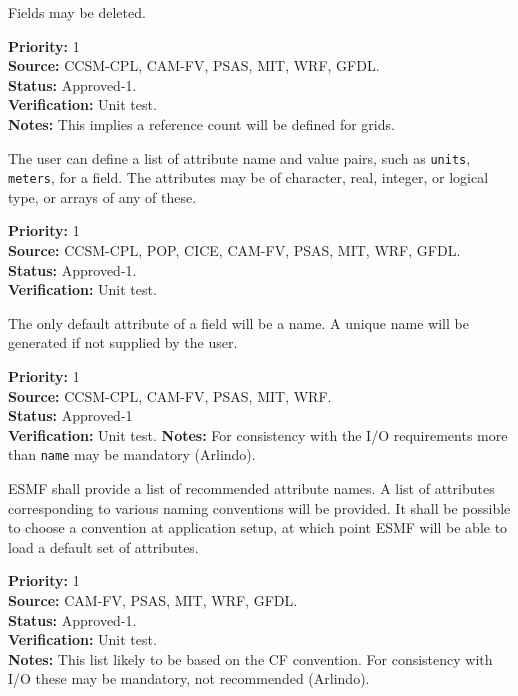 Fields may be deleted.
\begin{reqlist} 
{\bf Priority:} 1 \\
{\bf Source:} CCSM-CPL, CAM-FV, PSAS, MIT, WRF, GFDL. \\
{\bf Status:} Approved-1. \\
{\bf Verification:} Unit test. \\
{\bf Notes:} This implies a reference count will be defined for grids.
\end{reqlist}

The user can define a list of attribute name and value pairs, such 
as {\tt units}, {\tt meters}, for a field.  
The attributes may be of character, real, integer, or logical type,
or arrays of any of these.
\begin{reqlist}
{\bf Priority:} 1 \\
{\bf Source:} CCSM-CPL, POP, CICE, CAM-FV, PSAS, MIT, WRF, GFDL. \\
{\bf Status:} Approved-1. \\
{\bf Verification:} Unit test. 
\end{reqlist}

The only default attribute of a field will be a name. A unique name will be
generated if not supplied by the user.
\begin{reqlist}
{\bf Priority:} 1 \\
{\bf Source:} CCSM-CPL, CAM-FV, PSAS, MIT, WRF. \\
{\bf Status:} Approved-1 \\
{\bf Verification:} Unit test. 
{\bf Notes:} For consistency with the I/O requirements more than {\tt name} may be mandatory (Arlindo).
\end{reqlist}

ESMF shall provide a list of recommended attribute names. A list of
attributes corresponding to various naming conventions will be
provided. It shall be possible to choose a convention at application
setup, at which point ESMF will be able to load a default set of
attributes.

\begin{reqlist}
{\bf Priority:} 1 \\
{\bf Source:} CAM-FV, PSAS, MIT, WRF, GFDL. \\
{\bf Status:} Approved-1. \\
{\bf Verification:} Unit test. \\
{\bf Notes:} This list likely to be based on the CF convention. For
consistency with I/O these may be mandatory, not recommended (Arlindo).
\end{reqlist}


